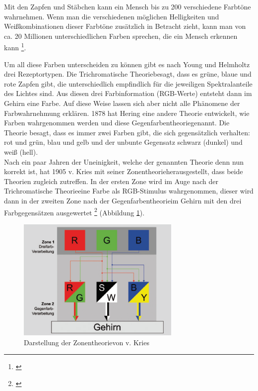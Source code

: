

Mit den Zapfen und Stäbchen kann ein Mensch bis zu 200 verschiedene Farbtöne wahrnehmen. Wenn man die verschiedenen möglichen Helligkeiten und Weißkombinationen dieser Farbtöne zusätzlich in Betracht zieht, kann man von ca. 20 Millionen unterschiedlichen Farben sprechen, die ein Mensch erkennen kann \footnote{\cite{unimann}}.
 
Um all diese Farben unterscheiden zu können gibt es nach Young und Helmholtz drei Rezeptortypen. Die \glqq Trichromatische Theorie\grqq besagt, dass es grüne, blaue und rote Zapfen gibt, die unterschiedlich empfindlich für die jeweiligen Spektralanteile des Lichtes sind. Aus diesen drei Farbinformation (RGB-Werte) entsteht dann im Gehirn eine Farbe. Auf diese Weise lassen sich aber nicht alle Phänomene der Farbwahrnehmung erklären. 1878 hat Hering eine andere Theorie entwickelt, wie Farben wahrgenommen werden und diese \glqq Gegenfarbentheorie\grqq genannt. Die Theorie besagt, dass es immer zwei Farben gibt, die sich gegensätzlich verhalten: rot und grün, blau und gelb und der unbunte Gegensatz schwarz (dunkel) und weiß (hell).\\ Nach ein paar Jahren der Uneinigkeit, welche der genannten Theorie denn nun korrekt ist, hat 1905 v. Kries mit seiner \glqq Zonentheorie\grqq herausgestellt, dass beide Theorien zugleich zutreffen. In der ersten Zone wird im Auge nach der \glqq Trichromatische Theorie\grqq eine Farbe als RGB-Stimulus wahrgenommen, dieser wird dann in der zweiten Zone nach der \glqq Gegenfarbentheorie\grqq im Gehirn mit den drei Farbgegensätzen ausgewertet \footnote{\cite[104]{hentschel}} (Abbildung \ref{b_zonen}).

 
\begin{figure}[H]     %
\centering
\includegraphics[width=0.7\textwidth]{bilder/zonen} 
\caption {Darstellung der \glqq Zonentheorie\grqq von v. Kries \protect\footnotemark}\label{b_zonen}
\end{figure}

